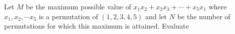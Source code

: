 Let $M$ be the maximum possible value of $x_1x_2+x_2x_3+\cdots +x_5x_1$ where $x_1, x_2, \cdots x_5$ is a permutation of $(1,2,3,4,5)$ and let $N$ be the number of permutations for which this maximum is attained. Evaluate 